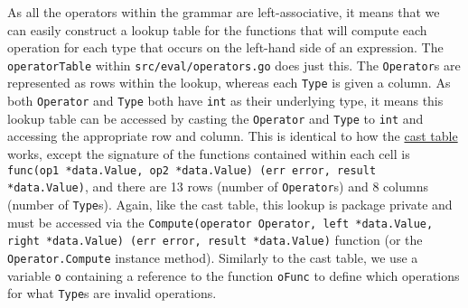 As all the operators within the grammar are left-associative, it means that we can easily construct a lookup table for the functions that will compute each operation for each type that occurs on the left-hand side of an expression. The \verb|operatorTable| within \verb|src/eval/operators.go| does just this. The \verb|Operator|s are represented as rows within the lookup, whereas each \verb|Type| is given a column. As both \verb|Operator| and \verb|Type| both have \texttt{int} as their underlying type, it means this lookup table can be accessed by casting the \verb|Operator| and \verb|Type| to \texttt{int} and accessing the appropriate row and column. This is identical to how the \hyperref[sec:development-casting]{cast table} works, except the signature of the functions contained within each cell is \texttt{func(op1 *data.Value, op2 *data.Value) (err error, result *data.Value)}, and there are 13 rows (number of \verb|Operator|s) and 8 columns (number of \verb|Type|s). Again, like the cast table, this lookup is package private and must be accessed via the \texttt{Compute(operator Operator, left *data.Value, right *data.Value) (err error, result *data.Value)} function (or the \verb|Operator.Compute| instance method). Similarly to the cast table, we use a variable \verb|o| containing a reference to the function \verb|oFunc| to define which operations for what \verb|Type|s are invalid operations.

\inputminted[firstline=84, lastline=85, autogobble, breaklines, tabsize=4]{go}{../../src/eval/operators.go}

\inputminted[firstline=106, lastline=118, autogobble, breaklines, tabsize=4]{go}{../../src/eval/operators.go}

